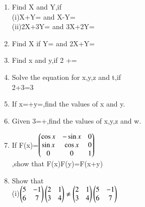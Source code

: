 \begin{enumerate}[label=\arabic*.,ref=\thesubsection.\theenumi]
\item Find X and Y,if\\
(i)X+Y= and X-Y=\\
(ii)2X+3Y= and 3X+2Y=\\ 
\solution 

\item Find X if Y= and 2X+Y=\\
\solution 

\item Find x and y,if 2 +=\\
\item Solve the equation for x,y,z and t,if \\
2+3=3\\
\item If x=+y=,find the values of x and y.\\
\item Given 3=+,find the values of x,y,z and w.\\
\item If F(x)=$\begin{pmatrix}\cos x &-\sin x &0\\ \sin x &\cos x &0\\0 &0 &1\end{pmatrix}$\\,show that F(x)F(y)=F(x+y)\\
\solution 

\item Show that\\
(i)$\begin{pmatrix}5 &-1\\6 &7\end{pmatrix}\begin{pmatrix}2 &1\\3 &4\end{pmatrix}\neq\begin{pmatrix}2 &1\\3 &4\end{pmatrix}\begin{pmatrix}5 &-1\\6 &7\end{pmatrix}$

\end{enumerate}
